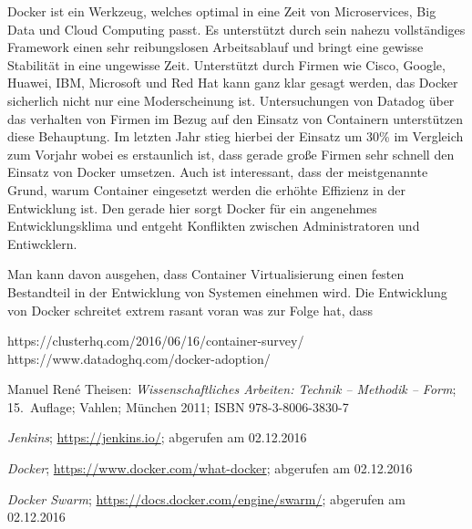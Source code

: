 \documentclass[12pt,toc=bib,toc=listof]{scrreprt}
\begin{document}
Docker ist ein Werkzeug, welches optimal in eine Zeit von Microservices, Big Data und Cloud Computing passt.
Es unterstützt durch sein nahezu vollständiges Framework einen sehr reibungslosen Arbeitsablauf und bringt eine gewisse Stabilität in eine ungewisse Zeit.
Unterstützt durch Firmen wie Cisco, Google, Huawei, IBM, Microsoft und Red Hat kann ganz klar gesagt werden, das Docker sicherlich nicht nur eine Moderscheinung ist.
Untersuchungen von Datadog über das verhalten von Firmen im Bezug auf den Einsatz von Containern unterstützen diese Behauptung.
Im letzten Jahr stieg hierbei der Einsatz um 30\% im Vergleich zum Vorjahr wobei es erstaunlich ist, dass gerade große Firmen sehr schnell den Einsatz von Docker umsetzen.
Auch ist interessant, dass der meistgenannte Grund, warum Container eingesetzt werden die erhöhte Effizienz in der Entwicklung ist.
Den gerade hier sorgt Docker für ein angenehmes Entwicklungsklima und entgeht Konflikten zwischen Administratoren und Entiwcklern.

Man kann davon ausgehen, dass Container Virtualisierung einen festen Bestandteil in der Entwicklung von Systemen einehmen wird.
Die Entwicklung von Docker schreitet extrem rasant voran was zur Folge hat, dass 




https://clusterhq.com/2016/06/16/container-survey/
https://www.datadoghq.com/docker-adoption/


\appendix
\begin{thebibliography}{99}
\raggedright
 Manuel René Theisen:
 \emph{Wissenschaftliches Arbeiten: Technik -- Methodik -- Form};
 15.~Auflage; Vahlen; München 2011;
 ISBN 978-3-8006-3830-7

 \emph{Jenkins};
 \url{https://jenkins.io/};
 abgerufen am 02.12.2016
 
 \emph{Docker};
 \url{https://www.docker.com/what-docker};
 abgerufen am 02.12.2016
 
  \emph{Docker Swarm};
 \url{https://docs.docker.com/engine/swarm/};
 abgerufen am 02.12.2016
 
 


 
 
 
 
 
 
\end{thebibliography}
\end{document}
